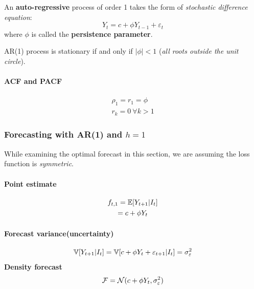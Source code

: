 \documentclass[11pt]{article}
\begin{document}
			\begin{definition}
				An \textbf{auto-regressive} process of order 1 takes the form of \emph{stochastic difference equation}:
				\begin{equation}
					Y_t = c + \phi Y_{t-1} + \varepsilon_t
				\end{equation}
				where $\phi$ is called the \textbf{persistence parameter}.
			\end{definition}
		
		\begin{proposition}
			AR(1) process is stationary if and only if $|\phi| < 1$ (\emph{all roots outside the unit circle}).
		\end{proposition}
		
		\paragraph{ACF and PACF}
			\begin{gather}
				\rho_1 = r_1 = \phi \\
				r_k = 0\ \forall k > 1
			\end{gather}
			
		\subsubsection{Forecasting with AR(1) and $h=1$}
			\begin{assumption}
				While examining the optimal forecast in this section, we are assuming the loss function is \emph{symmetric}.
			\end{assumption}
			
			\paragraph{Point estimate}
				\begin{gather}
					f_{t,1} = \mathbb{E}[{Y_{t+1}|I_t}] \\
					= c + \phi Y_t
				\end{gather}
			\paragraph{Forecast variance(uncertainty)}
				\begin{gather}
					\mathbb{V}[{Y_{t+1}|I_t}] = \mathbb{V}[{c + \phi Y_t + \varepsilon_{t+1}|I_t}]
					= \sigma_\varepsilon^2
				\end{gather}
			\textbf{Density forecast}
				\begin{gather}
					\mathcal{{F}} = \mathcal{{N}}(c + \phi Y_t, \sigma_\varepsilon^2)
				\end{gather}
				
\end{document}

